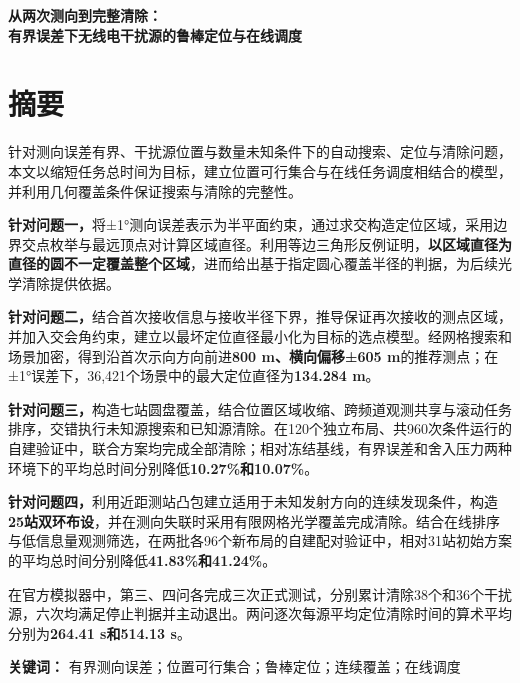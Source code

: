 \documentclass[UTF8,fontset=none,zihao=-4,a4paper]{ctexart}
\begin{document}
\pagestyle{plain}
\setlength{\abovedisplayskip}{8pt plus 2pt minus 2pt}
\setlength{\belowdisplayskip}{8pt plus 2pt minus 2pt}
\begin{center}
{\bfseries 从两次测向到完整清除：\\有界误差下无线电干扰源的鲁棒定位与在线调度}\par

\end{center}
\section{摘要}\label{ux6458ux8981}
\begingroup
\linespread{1.20}\selectfont

针对测向误差有界、干扰源位置与数量未知条件下的自动搜索、定位与清除问题，本文以缩短任务总时间为目标，建立位置可行集合与在线任务调度相结合的模型，并利用几何覆盖条件保证搜索与清除的完整性。

\textbf{针对问题一，}将±1°测向误差表示为半平面约束，通过求交构造定位区域，采用边界交点枚举与最远顶点对计算区域直径。利用等边三角形反例证明，\textbf{以区域直径为直径的圆不一定覆盖整个区域}，进而给出基于指定圆心覆盖半径的判据，为后续光学清除提供依据。

\textbf{针对问题二，}结合首次接收信息与接收半径下界，推导保证再次接收的测点区域，并加入交会角约束，建立以最坏定位直径最小化为目标的选点模型。经网格搜索和场景加密，得到沿首次示向方向前进\textbf{800 m、横向偏移±605 m}的推荐测点；在±1°误差下，36,421个场景中的最大定位直径为\textbf{134.284 m}。

\textbf{针对问题三，}构造七站圆盘覆盖，结合位置区域收缩、跨频道观测共享与滚动任务排序，交错执行未知源搜索和已知源清除。在120个独立布局、共960次条件运行的自建验证中，联合方案均完成全部清除；相对冻结基线，有界误差和舍入压力两种环境下的平均总时间分别降低\textbf{10.27\%和10.07\%}。

\textbf{针对问题四，}利用近距测站凸包建立适用于未知发射方向的连续发现条件，构造\textbf{25站双环布设}，并在测向失联时采用有限网格光学覆盖完成清除。结合在线排序与低信息量观测筛选，在两批各96个新布局的自建配对验证中，相对31站初始方案的平均总时间分别降低\textbf{41.83\%和41.24\%}。

在官方模拟器中，第三、四问各完成三次正式测试，分别累计清除38个和36个干扰源，六次均满足停止判据并主动退出。两问逐次每源平均定位清除时间的算术平均分别为\textbf{264.41 s和514.13 s}。

\textbf{关键词：} 有界测向误差；位置可行集合；鲁棒定位；连续覆盖；在线调度

\par\endgroup
\clearpage
\end{document}
